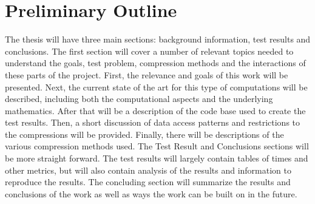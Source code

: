 \documentclass[titlepage]{article}
\begin{document}
\section{Preliminary Outline}

The thesis will have three main sections: background information, test results and conclusions.
The first section will cover a number of relevant topics needed to understand the goals, test problem, compression methods and the interactions of these parts of the project.
First, the relevance and goals of this work will be presented.
Next, the current state of the art for this type of computations will be described,
including both the computational aspects and the underlying mathematics.
After that will be a description of the code base used to create the test results.
Then, a short discussion of data access patterns and restrictions to the compressions will be provided.
Finally, there will be descriptions of the various compression methods used.
The Test Result and Conclusions sections will be more straight forward.
The test results will largely contain tables of times and other metrics, but will also contain analysis of the results and information to reproduce the results.
The concluding section will summarize the results and conclusions of the work as well as ways the work can be built on in the future.


\nocite{*}


\end{document}
